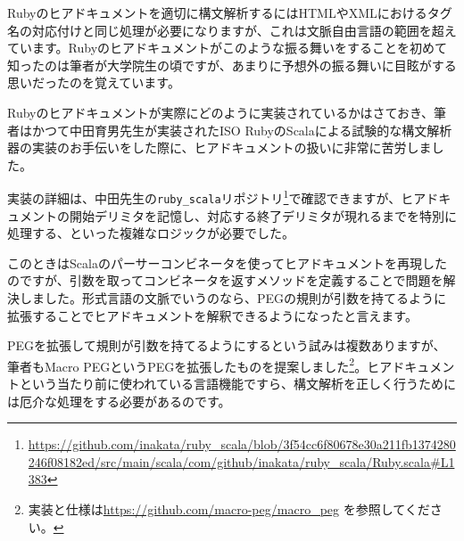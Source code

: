 Rubyのヒアドキュメントを適切に構文解析するにはHTMLやXMLにおけるタグ名の対応付けと同じ処理が必要になりますが、これは文脈自由言語の範囲を超えています。Rubyのヒアドキュメントがこのような振る舞いをすることを初めて知ったのは筆者が大学院生の頃ですが、あまりに予想外の振る舞いに目眩がする思いだったのを覚えています。

Rubyのヒアドキュメントが実際にどのように実装されているかはさておき、筆者はかつて中田育男先生が実装されたISO
RubyのScalaによる試験的な構文解析器の実装のお手伝いをした際に、ヒアドキュメントの扱いに非常に苦労しました。

実装の詳細は、中田先生の\texttt{ruby\_scala}リポジトリ\footnote{\url{https://github.com/inakata/ruby\_scala/blob/3f54cc6f80678e30a211fb1374280246f08182ed/src/main/scala/com/github/inakata/ruby\_scala/Ruby.scala\#L1383}}で確認できますが、ヒアドキュメントの開始デリミタを記憶し、対応する終了デリミタが現れるまでを特別に処理する、といった複雑なロジックが必要でした。

このときはScalaのパーサーコンビネータを使ってヒアドキュメントを再現したのですが、引数を取ってコンビネータを返すメソッドを定義することで問題を解決しました。形式言語の文脈でいうのなら、PEGの規則が引数を持てるように拡張することでヒアドキュメントを解釈できるようになったと言えます。

PEGを拡張して規則が引数を持てるようにするという試みは複数ありますが、筆者もMacro
PEGというPEGを拡張したものを提案しました\footnote{実装と仕様は\url{https://github.com/macro-peg/macro_peg}
  を参照してください。}。ヒアドキュメントという当たり前に使われている言語機能ですら、構文解析を正しく行うためには厄介な処理をする必要があるのです。

